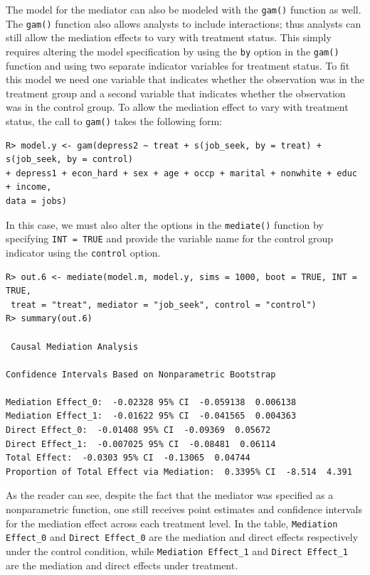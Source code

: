 \documentclass[11pt,letterpaper]{article}
\theoremstyle{plain}
\begin{document}
The model for the mediator can also be modeled with the \texttt{gam()}
function as well.  The \texttt{gam()} function also allows analysts to
include interactions; thus analysts can still allow the mediation
effects to vary with treatment status.  This simply requires altering
the model specification by using the \texttt{by} option in the
\texttt{gam()} function and using two separate indicator variables for
treatment status.  To fit this model we need one variable that
indicates whether the observation was in the treatment group and a
second variable that indicates whether the observation was in the
control group.  To allow the mediation effect to vary with treatment
status, the call to \texttt{gam()} takes the following form:
\begin{verbatim}
R> model.y <- gam(depress2 ~ treat + s(job_seek, by = treat) + s(job_seek, by = control)
+ depress1 + econ_hard + sex + age + occp + marital + nonwhite + educ + income,
data = jobs)
\end{verbatim}
In this case, we must also alter the options in the \texttt{mediate()}
function by specifying \texttt{INT = TRUE} and provide the variable
name for the control group indicator using the \texttt{control} option.
\begin{verbatim}
R> out.6 <- mediate(model.m, model.y, sims = 1000, boot = TRUE, INT = TRUE,
 treat = "treat", mediator = "job_seek", control = "control")
R> summary(out.6)

 Causal Mediation Analysis

Confidence Intervals Based on Nonparametric Bootstrap

Mediation Effect_0:  -0.02328 95% CI  -0.059138  0.006138
Mediation Effect_1:  -0.01622 95% CI  -0.041565  0.004363
Direct Effect_0:  -0.01408 95% CI  -0.09369  0.05672
Direct Effect_1:  -0.007025 95% CI  -0.08481  0.06114
Total Effect:  -0.0303 95% CI  -0.13065  0.04744
Proportion of Total Effect via Mediation:  0.3395% CI  -8.514  4.391
\end{verbatim}

As the reader can see, despite the fact that the mediator was
specified as a nonparametric function, one still receives point
estimates and confidence intervals for the mediation effect across
each treatment level.  In the table, \texttt{Mediation Effect\_0} and
\texttt{Direct Effect\_0} are the mediation and direct effects
respectively under the control condition, while \texttt{Mediation
  Effect\_1} and \texttt{Direct Effect\_1} are the mediation and
direct effects under treatment.
\end{document}
